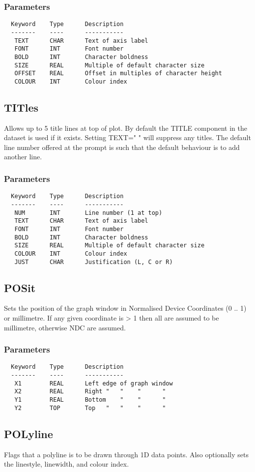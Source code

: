 \documentclass{book}
\renewcommand{\_}{{\tt\char'137}}     %
\begin{document}
\subsubsection{Parameters}
\begin{verbatim}
  Keyword    Type      Description
  -------    ----      -----------
   TEXT      CHAR      Text of axis label
   FONT      INT       Font number
   BOLD      INT       Character boldness
   SIZE      REAL      Multiple of default character size
   OFFSET    REAL      Offset in multiples of character height
   COLOUR    INT       Colour index
\end{verbatim}\subsection{TITles}
Allows up to 5 title lines at top of plot. By default the TITLE
component in the dataset is used if it exists. Setting TEXT=" "
will suppress any titles. The default line number offered at the
prompt is such that the default behaviour is to add another line.

\subsubsection{Parameters}
\begin{verbatim}
  Keyword    Type      Description
  -------    ----      -----------
   NUM       INT       Line number (1 at top)
   TEXT      CHAR      Text of axis label
   FONT      INT       Font number
   BOLD      INT       Character boldness
   SIZE      REAL      Multiple of default character size
   COLOUR    INT       Colour index
   JUST      CHAR      Justification (L, C or R)
\end{verbatim}\subsection{POSit}
Sets the position of the graph window in Normalised Device
Coordinates (0 .. 1) or millimetre. If any given coordinate
is > 1 then all are assumed to be millimetre, otherwise NDC
are assumed.

\subsubsection{Parameters}
\begin{verbatim}
  Keyword    Type      Description
  -------    ----      -----------
   X1        REAL      Left edge of graph window
   X2        REAL      Right "   "    "      "
   Y1        REAL      Bottom    "    "      "
   Y2        TOP       Top   "   "    "      "
\end{verbatim}\subsection{POLyline}
Flags that a polyline is to be drawn through 1D data points.
Also optionally sets the linestyle, linewidth, and
colour index.
\end{document}
